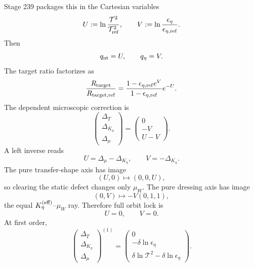 Stage 239 packages this in the Cartesian variables
\begin{equation}
\label{eq:part07-uv-def}
U:=\ln\frac{\mathcal T^2}{\mathcal T_{\rm ref}^2},
\qquad
V:=\ln\frac{\epsilon_\eta}{\epsilon_{\eta,\rm ref}}.
\end{equation}
Then
\begin{equation}
\label{eq:part07-rm-packet-uv}
q_{\rm nt}=U,
\qquad
q_\eta=V.
\end{equation}
The target ratio factorizes as
\begin{equation}
\label{eq:part07-rtarget-uv}
\frac{R_{\rm target}}{R_{\rm target,ref}}
=
\frac{1-\epsilon_{\eta,\rm ref}e^V}{1-\epsilon_{\eta,\rm ref}}e^{-U}.
\end{equation}
The dependent microscopic correction is
\begin{equation}
\label{eq:part07-uv-dependent-correction}
\begin{pmatrix}\Delta_T\\\Delta_{K_\eta}\\\Delta_\mu\end{pmatrix}
=
\begin{pmatrix}0\\-V\\U-V\end{pmatrix}.
\end{equation}
A left inverse reads
\begin{equation}
\label{eq:part07-uv-left-inverse}
U=\Delta_\mu-\Delta_{K_\eta},
\qquad
V=-\Delta_{K_\eta}.
\end{equation}
The pure transfer-shape axis has image
\begin{equation}
\label{eq:part07-pure-transfer-image}
(U,0)
\longmapsto
(0,0,U),
\end{equation}
so clearing the static defect changes only \(\mu_W\).  The pure dressing axis has image
\begin{equation}
\label{eq:part07-pure-dressing-image}
(0,V)
\longmapsto
-V(0,1,1),
\end{equation}
the equal \(K_\eta^{(\rm eff)}\)--\(\mu_W\) ray.  Therefore full orbit lock is
\begin{equation}
\label{eq:part07-uv-orbit-lock}
U=0,
\qquad
V=0.
\end{equation}
At first order,
\begin{equation}
\label{eq:part07-uv-first-order-dependent}
\begin{pmatrix}\Delta_T\\\Delta_{K_\eta}\\\Delta_\mu\end{pmatrix}^{(1)}
=
\begin{pmatrix}
0\\
-\delta\ln\epsilon_\eta\\
\delta\ln\mathcal T^2-\delta\ln\epsilon_\eta
\end{pmatrix}.
\end{equation}


